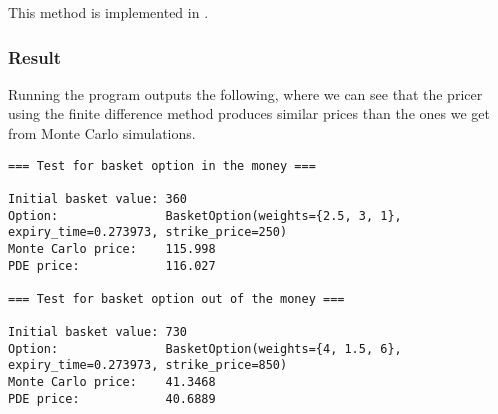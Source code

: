\documentclass[english]{article}
\newcommand{\comment}[1]{\color{blue}#1\color{black}}
\numberwithin{equation}{section}
\numberwithin{figure}{section}
\theoremstyle{bolddescit}
\theoremstyle{definition}
\theoremstyle{definition}
\theoremstyle{plain}
\theoremstyle{plain}
\theoremstyle{bolddesc}
\theoremstyle{plain}
\theoremstyle{remark}
\begin{document}
This method is implemented in .

\subsubsection*{Result}

Running the program outputs the following, where we can see that the pricer using the finite difference method produces similar prices than the ones we get from Monte Carlo simulations.

{\scriptsize
\begin{verbatim}
=== Test for basket option in the money ===

Initial basket value: 360
Option:               BasketOption(weights={2.5, 3, 1}, expiry_time=0.273973, strike_price=250)
Monte Carlo price:    115.998
PDE price:            116.027

=== Test for basket option out of the money ===

Initial basket value: 730
Option:               BasketOption(weights={4, 1.5, 6}, expiry_time=0.273973, strike_price=850)
Monte Carlo price:    41.3468
PDE price:            40.6889
\end{verbatim}
}


\pagebreak
\printbibliography
\end{document}

